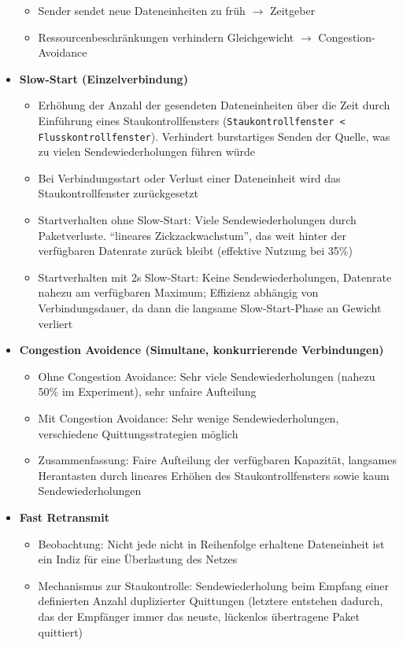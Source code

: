 \begin{itemize}
\begin{itemize}
		\item Sender sendet neue Dateneinheiten zu früh \(\rightarrow\) Zeitgeber
		\item Ressourcenbeschränkungen verhindern Gleichgewicht \(\rightarrow\) Congestion-Avoidance
	\end{itemize}
	\item \textbf{Slow-Start (Einzelverbindung)}
	\begin{itemize}
		\item Erhöhung der Anzahl der gesendeten Dateneinheiten über die Zeit durch Einführung eines Staukontrollfensters (\texttt{Staukontrollfenster < Flusskontrollfenster}). Verhindert burstartiges Senden der Quelle, was zu vielen Sendewiederholungen führen würde
		\item Bei Verbindungsstart oder Verlust einer Dateneinheit wird das Staukontrollfenster zurückgesetzt
		\item Startverhalten ohne Slow-Start: Viele Sendewiederholungen durch Paketverluste. "`lineares Zickzackwachstum"', das weit hinter der verfügbaren Datenrate zurück bleibt (effektive Nutzung bei 35\%)
		\item Startverhalten mit 2s Slow-Start: Keine Sendewiederholungen, Datenrate nahezu am verfügbaren Maximum; Effizienz abhängig von Verbindungsdauer, da dann die langsame Slow-Start-Phase an Gewicht verliert
	\end{itemize}
	\item \textbf{Congestion Avoidence (Simultane, konkurrierende Verbindungen)}
	\begin{itemize}
		\item Ohne Congestion Avoidance: Sehr viele Sendewiederholungen (nahezu 50\% im Experiment), sehr unfaire Aufteilung
		\item Mit Congestion Avoidance: Sehr wenige Sendewiederholungen, verschiedene Quittungsstrategien möglich
		\item Zusammenfassung: Faire Aufteilung der verfügbaren Kapazität, langsames Herantasten durch lineares Erhöhen des Staukontrollfensters sowie kaum Sendewiederholungen
	\end{itemize}
	\item \textbf{Fast Retransmit}
	\begin{itemize}
		\item Beobachtung: Nicht jede nicht in Reihenfolge erhaltene Dateneinheit ist ein Indiz für eine Überlastung des Netzes
		\item Mechanismus zur Staukontrolle: Sendewiederholung beim Empfang einer definierten Anzahl duplizierter Quittungen (letztere entstehen dadurch, das der Empfänger immer das neuste, lückenlos übertragene Paket quittiert)

\end{itemize}
\end{itemize}

